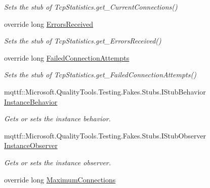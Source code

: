 \begin{DoxyCompactItemize}
\begin{DoxyCompactList}\small\item\em Sets the stub of Tcp\-Statistics.\-get\-\_\-\-Current\-Connections()\end{DoxyCompactList}\item 
override long \hyperlink{class_system_1_1_net_1_1_network_information_1_1_fakes_1_1_stub_tcp_statistics_ac667e8c4b97f00694b75816fb1d1d5b5}{Errors\-Received}
\begin{DoxyCompactList}\small\item\em Sets the stub of Tcp\-Statistics.\-get\-\_\-\-Errors\-Received()\end{DoxyCompactList}\item 
override long \hyperlink{class_system_1_1_net_1_1_network_information_1_1_fakes_1_1_stub_tcp_statistics_a2066fb12741d08ae344f4ba8feb176c4}{Failed\-Connection\-Attempts}
\begin{DoxyCompactList}\small\item\em Sets the stub of Tcp\-Statistics.\-get\-\_\-\-Failed\-Connection\-Attempts()\end{DoxyCompactList}\item 
mqttf\-::\-Microsoft.\-Quality\-Tools.\-Testing.\-Fakes.\-Stubs.\-I\-Stub\-Behavior \hyperlink{class_system_1_1_net_1_1_network_information_1_1_fakes_1_1_stub_tcp_statistics_a67095c134c98135af98688453030a30c}{Instance\-Behavior}
\begin{DoxyCompactList}\small\item\em Gets or sets the instance behavior.\end{DoxyCompactList}\item 
mqttf\-::\-Microsoft.\-Quality\-Tools.\-Testing.\-Fakes.\-Stubs.\-I\-Stub\-Observer \hyperlink{class_system_1_1_net_1_1_network_information_1_1_fakes_1_1_stub_tcp_statistics_a0628139c25cd624e58ebe95342cf0316}{Instance\-Observer}
\begin{DoxyCompactList}\small\item\em Gets or sets the instance observer.\end{DoxyCompactList}\item 
override long \hyperlink{class_system_1_1_net_1_1_network_information_1_1_fakes_1_1_stub_tcp_statistics_a10cf09ec3263e0d3b678d5ff6acb1b82}{Maximum\-Connections}

\end{DoxyCompactItemize}
